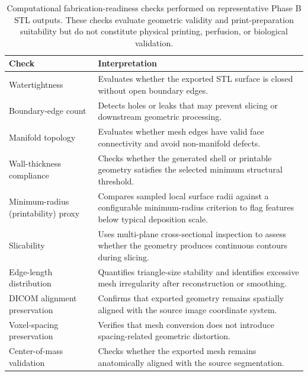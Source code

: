 \documentclass[anonymous]{iopjournal}
\begin{document}
\begin{table}[!t]
\centering
\caption{Computational fabrication-readiness checks performed on representative Phase B STL outputs. These checks evaluate geometric validity and print-preparation suitability but do not constitute physical printing, perfusion, or biological validation.}
\label{tab:fabrication-readiness-checks}
\begin{threeparttable}
\footnotesize
\begin{tabularx}{0.96\textwidth}{L{0.31\textwidth}Y}
\toprule
\textbf{Check} & \textbf{Interpretation} \\
\midrule
Watertightness & Evaluates whether the exported STL surface is closed without open boundary edges. \\
Boundary-edge count & Detects holes or leaks that may prevent slicing or downstream geometric processing. \\
Manifold topology & Evaluates whether mesh edges have valid face connectivity and avoid non-manifold defects. \\
Wall-thickness compliance & Checks whether the generated shell or printable geometry satisfies the selected minimum structural threshold. \\
Minimum-radius (printability) proxy & Compares sampled local surface radii against a configurable minimum-radius criterion to flag features below typical deposition scale. \\ %
Slicability & Uses multi-plane cross-sectional inspection to assess whether the geometry produces continuous contours during slicing. \\
Edge-length distribution & Quantifies triangle-size stability and identifies excessive mesh irregularity after reconstruction or smoothing. \\
DICOM alignment preservation & Confirms that exported geometry remains spatially aligned with the source image coordinate system. \\
Voxel-spacing preservation & Verifies that mesh conversion does not introduce spacing-related geometric distortion. \\
Center-of-mass validation & Checks whether the exported mesh remains anatomically aligned with the source segmentation. \\
\bottomrule
\end{tabularx}
\end{threeparttable}
\end{table}

\FloatBarrier
\end{document}
